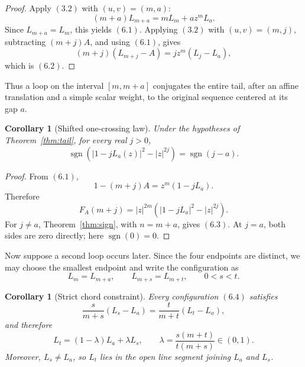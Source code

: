 \documentclass[11pt]{article}
\newtheorem{corollary}[theorem]{Corollary}
\theoremstyle{definition}
\begin{document}
\begin{proof}
Apply \((3.2)\) with \((u,v)=(m,a)\):
\[
 (m+a)L_{m+a}=mL_m+az^mL_a.
\]
Since \(L_{m+a}=L_m\), this yields \((6.1)\).  Applying \((3.2)\) with
\((u,v)=(m,j)\), subtracting \((m+j)A\), and using \((6.1)\), gives
\[
 (m+j)(L_{m+j}-A)=jz^m(L_j-L_a),
\]
which is \((6.2)\).
\end{proof}

Thus a loop on the interval \([m,m+a]\) conjugates the entire tail, after an
affine translation and a simple scalar weight, to the original sequence
centered at its gap \(a\).

\begin{corollary}[Shifted one-crossing law]\label{cor:shiftedsign}
Under the hypotheses of Theorem~\ref{thm:tail}, for every real \(j>0\),
\begin{equation}
 \operatorname{sgn}
 \left(|1-jL_a(z)|^2-|z|^{2j}\right)
 =\operatorname{sgn}(j-a).
 \tag{6.3}
\end{equation}
\end{corollary}

\begin{proof}
From \((6.1)\),
\[
 1-(m+j)A=z^m(1-jL_a).
\]
Therefore
\[
 F_A(m+j)=|z|^{2m}
 \left(|1-jL_a|^2-|z|^{2j}\right).
\]
For \(j\neq a\), Theorem~\ref{thm:sign}, with \(n=m+a\), gives
\((6.3)\).  At \(j=a\), both sides are zero directly; here
\(\operatorname{sgn}(0)=0\).
\end{proof}

Now suppose a second loop occurs later.  Since the four endpoints are distinct,
we may choose the smallest endpoint and write the configuration as
\begin{equation}
 L_m=L_{m+a},
 \qquad
 L_{m+s}=L_{m+t},
 \qquad 0<s<t.
 \tag{6.4}
\end{equation}

\begin{corollary}[Strict chord constraint]\label{cor:chord}
Every configuration \((6.4)\) satisfies
\begin{equation}
 \frac{s}{m+s}(L_s-L_a)
 =\frac{t}{m+t}(L_t-L_a),
 \tag{6.5}
\end{equation}
and therefore
\begin{equation}
 L_t=(1-\lambda)L_a+\lambda L_s,
 \qquad
 \lambda=\frac{s(m+t)}{t(m+s)}\in(0,1).
 \tag{6.6}
\end{equation}
Moreover, \(L_s\neq L_a\), so \(L_t\) lies in the open line segment joining
\(L_a\) and \(L_s\).
\end{corollary}
\end{document}
